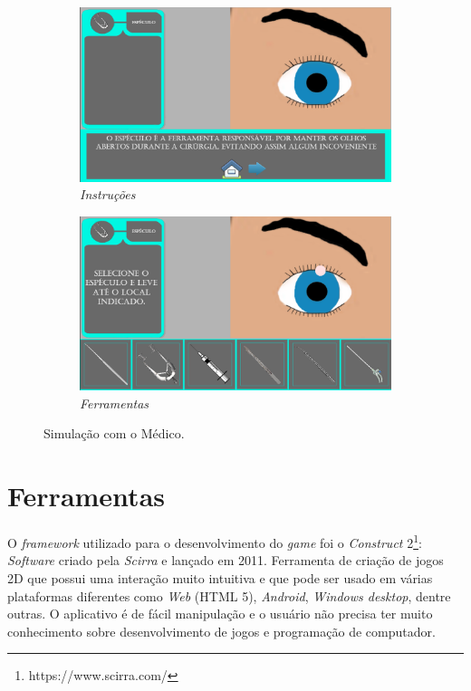 \documentclass[
	12pt,				%
    oneside,			%
	a4paper,			%
	english,			%
	french,				%
	spanish,			%
	brazil,				%
	]{abntex2}
\begin{document}
\begin{figure}[H]
  \begin{subfigure}[b]{0.5\textwidth}
    \includegraphics[width=\textwidth]{Medico1.PNG}
    \caption{\textit{Instruções}}
    \label{fig:f1}
  \end{subfigure}
  \hfill
  \begin{subfigure}[b]{0.5\textwidth}
    \includegraphics[width=\textwidth]{Medico2.PNG}
    \caption{\textit{Ferramentas}}
    \label{fig:f2}
  \end{subfigure}
  \caption{Simulação com o Médico.}
\end{figure}

\section{Ferramentas}

O \textit{framework} utilizado para o desenvolvimento do \textit{game} foi o \textit{Construct} 2\footnote{https://www.scirra.com/}: \textit{Software} criado pela \textit{Scirra} e lançado em 2011. Ferramenta de criação de jogos 2D que possui uma interação muito intuitiva e que pode ser usado em várias plataformas diferentes como \textit{Web} (HTML 5), \textit{Android}, \textit{Windows desktop}, dentre outras. O aplicativo é de fácil manipulação e o usuário não precisa ter muito conhecimento sobre desenvolvimento de jogos e programação de computador.
\end{document}
